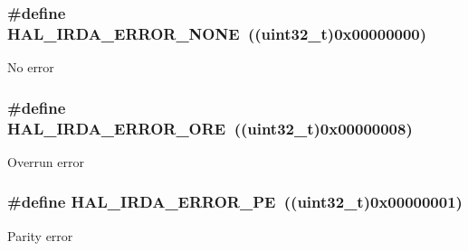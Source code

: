 \subsubsection[{\texorpdfstring{H\+A\+L\+\_\+\+I\+R\+D\+A\+\_\+\+E\+R\+R\+O\+R\+\_\+\+N\+O\+NE}{HAL_IRDA_ERROR_NONE}}]{\setlength{\rightskip}{0pt plus 5cm}\#define H\+A\+L\+\_\+\+I\+R\+D\+A\+\_\+\+E\+R\+R\+O\+R\+\_\+\+N\+O\+NE~((uint32\+\_\+t)0x00000000)}\hypertarget{group___i_r_d_a___error___code_ga5e2f0a4853b89feb89395d6447c7278c}{}\label{group___i_r_d_a___error___code_ga5e2f0a4853b89feb89395d6447c7278c}
No error 
\subsubsection[{\texorpdfstring{H\+A\+L\+\_\+\+I\+R\+D\+A\+\_\+\+E\+R\+R\+O\+R\+\_\+\+O\+RE}{HAL_IRDA_ERROR_ORE}}]{\setlength{\rightskip}{0pt plus 5cm}\#define H\+A\+L\+\_\+\+I\+R\+D\+A\+\_\+\+E\+R\+R\+O\+R\+\_\+\+O\+RE~((uint32\+\_\+t)0x00000008)}\hypertarget{group___i_r_d_a___error___code_ga452db15804671ee712e2943fb7eebbc8}{}\label{group___i_r_d_a___error___code_ga452db15804671ee712e2943fb7eebbc8}
Overrun error 
\subsubsection[{\texorpdfstring{H\+A\+L\+\_\+\+I\+R\+D\+A\+\_\+\+E\+R\+R\+O\+R\+\_\+\+PE}{HAL_IRDA_ERROR_PE}}]{\setlength{\rightskip}{0pt plus 5cm}\#define H\+A\+L\+\_\+\+I\+R\+D\+A\+\_\+\+E\+R\+R\+O\+R\+\_\+\+PE~((uint32\+\_\+t)0x00000001)}\hypertarget{group___i_r_d_a___error___code_ga6d09c3b0aa03defa115a9b35b4b11d15}{}\label{group___i_r_d_a___error___code_ga6d09c3b0aa03defa115a9b35b4b11d15}
Parity error 